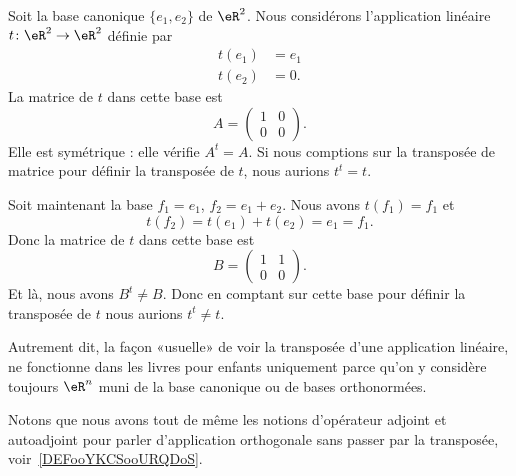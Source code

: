 \begin{example}
	Soit la base canonique \( \{ e_1,e_2 \}\) de \( \eR^2\). Nous considérons l'application linéaire \( t\colon \eR^2\to \eR^2\) définie par
	\begin{subequations}
		\begin{align}
			t(e_1) & =e_1 \\
			t(e_2) & =0.
		\end{align}
	\end{subequations}
	La matrice de \( t\) dans cette base est
	\begin{equation}
		A=\begin{pmatrix}
			1 & 0 \\
			0 & 0
		\end{pmatrix}.
	\end{equation}
	Elle est symétrique : elle vérifie \( A^t=A\). Si nous comptions sur la transposée de matrice pour définir la transposée de \( t\), nous aurions \( t^t=t\).

	Soit maintenant la base \( f_1=e_1\), \( f_2=e_1+e_2\). Nous avons \( t(f_1)=f_1\) et
	\begin{equation}
		t(f_2)=t(e_1)+t(e_2)=e_1=f_1.
	\end{equation}
	Donc la matrice de \( t\) dans cette base est
	\begin{equation}
		B=\begin{pmatrix}
			1 & 1 \\
			0 & 0
		\end{pmatrix}.
	\end{equation}
	Et là, nous avons \( B^t\neq B\). Donc en comptant sur cette base pour définir la transposée de \( t\) nous aurions \( t^t\neq t\).
\end{example}

\begin{normaltext}      \label{NooMZVRooExWVKJ}
	Autrement dit, la façon «usuelle» de voir la transposée d'une application linéaire, ne fonctionne dans les livres pour enfants uniquement parce qu'on y considère toujours \( \eR^n\) muni de la base canonique ou de bases orthonormées.

	Notons que nous avons tout de même les notions d'opérateur adjoint et autoadjoint pour parler d'application orthogonale sans passer par la transposée, voir~\ref{DEFooYKCSooURQDoS}.
\end{normaltext}

